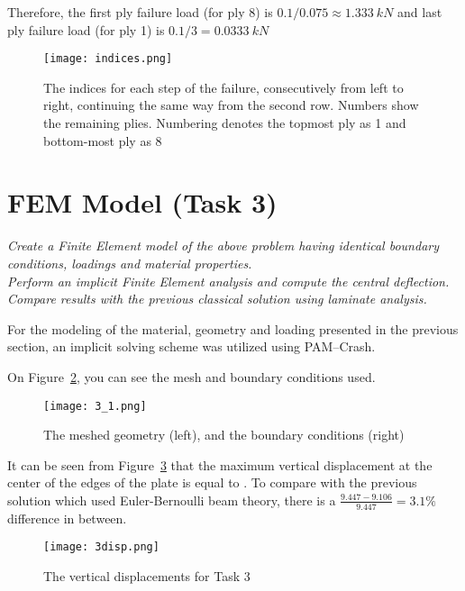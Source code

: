 \documentclass[a4paper,twosided,11pt,DIV14]{scrartcl}
\begin{document}
Therefore, the first ply failure load (for ply 8) is $0.1/0.075 \approx
\SI{1.333}{kN}$
and last ply failure load (for ply 1) is $0.1/3 = \SI{0.0333}{kN}$

\begin{figure}[H]
\begin{center}
  \texttt{[image: indices.png]}
\end{center}
\caption{The indices for each step of the failure, consecutively from left to
  right, continuing the same way from the second row. Numbers show the remaining
  plies. Numbering denotes the topmost ply as 1 and bottom-most ply as 8}
\label{fig:indices1}
\end{figure}

\section{FEM Model (Task 3)}

\textit{Create a Finite Element model of the above problem having identical
boundary conditions, loadings and material properties.
\\Perform an implicit Finite Element analysis and compute the central
deflection. Compare results with the previous classical solution using laminate
analysis.}

For the modeling of the material, geometry and loading presented in the
previous section, an implicit solving scheme was utilized using PAM--Crash.

On Figure~\ref{fig:31}, you can see the mesh and boundary conditions used.

\begin{figure}[H]
\begin{center}
  \texttt{[image: 3\_1.png]}
\end{center}
\caption{The meshed geometry (left), and the boundary conditions (right)}
\label{fig:31}
\end{figure}

It can be seen from Figure~\ref{fig:32} that the maximum vertical displacement
at the center of the edges of the plate is equal to . To compare
with the previous solution which used Euler-Bernoulli beam theory, there is a
$\frac{9.447-9.106}{9.447} = 3.1\%$ difference in between.

\begin{figure}[H]
\begin{center}
  \texttt{[image: 3disp.png]}
\end{center}
\caption{The vertical displacements for Task 3}
\label{fig:32}
\end{figure}
\end{document}
